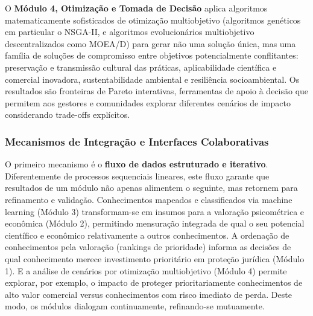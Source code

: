 O \textbf{Módulo 4, Otimização e Tomada de Decisão} aplica algoritmos matematicamente sofisticados de otimização multiobjetivo (algoritmos genéticos em particular o NSGA-II, e algoritmos evolucionários multiobjetivo descentralizados como MOEA/D) para gerar não uma solução única, mas uma família de soluções de compromisso entre objetivos potencialmente conflitantes: preservação e transmissão cultural das práticas, aplicabilidade científica e comercial inovadora, sustentabilidade ambiental e resiliência socioambiental. Os resultados são fronteiras de Pareto interativas, ferramentas de apoio à decisão que permitem aos gestores e comunidades explorar diferentes cenários de impacto considerando trade-offs explícitos.

\subsubsection{Mecanismos de Integração e Interfaces Colaborativas}


O primeiro mecanismo é o \textbf{fluxo de dados estruturado e iterativo}. Diferentemente de processos sequenciais lineares, este fluxo garante que resultados de um módulo não apenas alimentem o seguinte, mas retornem para refinamento e validação. Conhecimentos mapeados e classificados via machine learning (Módulo 3) transformam-se em insumos para a valoração psicométrica e econômica (Módulo 2), permitindo mensuração integrada de qual o seu potencial científico e econômico relativamente a outros conhecimentos. A ordenação de conhecimentos pela valoração (rankings de prioridade) informa as decisões de qual conhecimento merece investimento prioritário em proteção jurídica (Módulo 1). E a análise de cenários por otimização multiobjetivo (Módulo 4) permite explorar, por exemplo, o impacto de proteger prioritariamente conhecimentos de alto valor comercial versus conhecimentos com risco imediato de perda. Deste modo, os módulos dialogam continuamente, refinando-se mutuamente.

